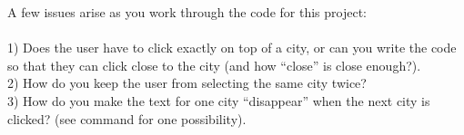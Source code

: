 A few issues arise as you work through the code for this project:\\
\\
1) Does the user have to click exactly on top of a city, or can you write the code so that they can click close to the city (and how ``close'' is close enough?).\\
2) How do you keep the user from selecting the same city twice?\\
3) How do you make the text for one city ``disappear'' when the next city is clicked? (see  command for one possibility).\\


%
%

